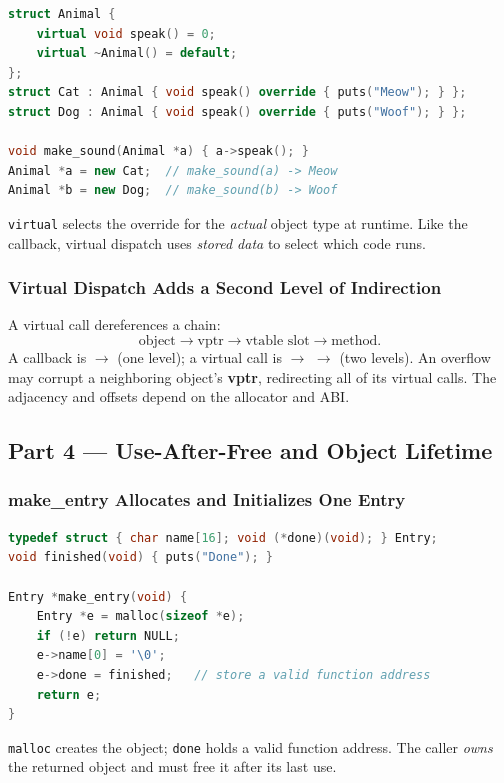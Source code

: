 \documentclass[hidelinks]{article}
\begin{document}
\begin{lstlisting}[language=C++]
struct Animal {
    virtual void speak() = 0;
    virtual ~Animal() = default;
};
struct Cat : Animal { void speak() override { puts("Meow"); } };
struct Dog : Animal { void speak() override { puts("Woof"); } };

void make_sound(Animal *a) { a->speak(); }
Animal *a = new Cat;  // make_sound(a) -> Meow
Animal *b = new Dog;  // make_sound(b) -> Woof
\end{lstlisting}
\texttt{virtual} selects the override for the \emph{actual} object type at runtime. Like the callback, virtual dispatch uses \emph{stored data} to select which code runs.

\subsubsection{Virtual Dispatch Adds a Second Level of Indirection}

A virtual call dereferences a chain:
\[
\text{object} \to \text{vptr} \to \text{vtable slot} \to \text{method}.
\]
A callback is  $\to$  (one level); a virtual call is  $\to$  $\to$  (two levels). An overflow may corrupt a neighboring object's \textbf{vptr}, redirecting all of its virtual calls. The adjacency and offsets depend on the allocator and ABI.

\subsection{Part 4 --- Use-After-Free and Object Lifetime}

\subsubsection{make\_entry Allocates and Initializes One Entry}

\begin{lstlisting}[language=C]
typedef struct { char name[16]; void (*done)(void); } Entry;
void finished(void) { puts("Done"); }

Entry *make_entry(void) {
    Entry *e = malloc(sizeof *e);
    if (!e) return NULL;
    e->name[0] = '\0';
    e->done = finished;   // store a valid function address
    return e;
}
\end{lstlisting}
\texttt{malloc} creates the object; \texttt{done} holds a valid function address. The caller \emph{owns} the returned object and must free it after its last use.
\end{document}
